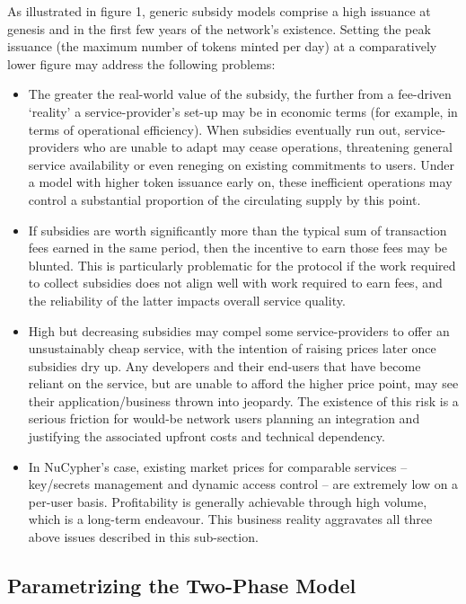 \documentclass[longbibliography,nofootinbib]{revtex4-1}
\begin{document}
As illustrated in figure 1, generic subsidy models comprise a high issuance at genesis and in the first few years of the network's existence. Setting the peak issuance (the maximum number of tokens minted per day) at a comparatively lower figure may address the following problems: 
\begin{itemize}
\item The greater the real-world value of the subsidy, the further from a fee-driven `reality' a service-provider's set-up may be in economic terms (for example, in terms of operational efficiency). When subsidies eventually run out, service-providers who are unable to adapt may cease operations, threatening general service availability or even reneging on existing commitments to users. Under a model with higher token issuance early on, these inefficient operations may control a substantial proportion of the circulating supply by this point. 
\item If subsidies are worth significantly more than the typical sum of transaction fees earned in the same period, then the incentive to earn those fees may be blunted. This is particularly problematic for the protocol if the work required to collect subsidies does not align well with work required to earn fees, and the reliability of the latter impacts overall service quality. 
\item High but decreasing subsidies may compel some service-providers to offer an unsustainably cheap service, with the intention of raising prices later once subsidies dry up. Any developers and their end-users that have become reliant on the service, but are unable to afford the higher price point, may see their application/business thrown into jeopardy. The existence of this risk is a serious friction for would-be network users planning an integration and justifying the associated upfront costs and technical dependency.
\item In NuCypher's case, existing market prices for comparable services – key/secrets management and dynamic access control – are extremely low on a per-user basis. Profitability is generally achievable through high volume, which is a long-term endeavour. This business reality aggravates all three above issues described in this sub-section.
\end{itemize}

\subsection{Parametrizing the Two-Phase Model}
\end{document}
